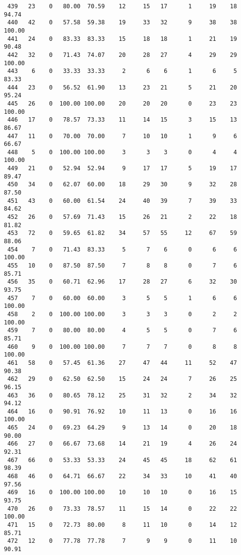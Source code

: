\begin{verbatim}
 439   23    0   80.00  70.59    12     15   17      1     19    18    94.74
 440   42    0   57.58  59.38    19     33   32      9     38    38   100.00
 441   24    0   83.33  83.33    15     18   18      1     21    19    90.48
 442   32    0   71.43  74.07    20     28   27      4     29    29   100.00
 443    6    0   33.33  33.33     2      6    6      1      6     5    83.33
 444   23    0   56.52  61.90    13     23   21      5     21    20    95.24
 445   26    0  100.00 100.00    20     20   20      0     23    23   100.00
 446   17    0   78.57  73.33    11     14   15      3     15    13    86.67
 447   11    0   70.00  70.00     7     10   10      1      9     6    66.67
 448    5    0  100.00 100.00     3      3    3      0      4     4   100.00
 449   21    0   52.94  52.94     9     17   17      5     19    17    89.47
 450   34    0   62.07  60.00    18     29   30      9     32    28    87.50
 451   43    0   60.00  61.54    24     40   39      7     39    33    84.62
 452   26    0   57.69  71.43    15     26   21      2     22    18    81.82
 453   72    0   59.65  61.82    34     57   55     12     67    59    88.06
 454    7    0   71.43  83.33     5      7    6      0      6     6   100.00
 455   10    0   87.50  87.50     7      8    8      0      7     6    85.71
 456   35    0   60.71  62.96    17     28   27      6     32    30    93.75
 457    7    0   60.00  60.00     3      5    5      1      6     6   100.00
 458    2    0  100.00 100.00     3      3    3      0      2     2   100.00
 459    7    0   80.00  80.00     4      5    5      0      7     6    85.71
 460    9    0  100.00 100.00     7      7    7      0      8     8   100.00
 461   58    0   57.45  61.36    27     47   44     11     52    47    90.38
 462   29    0   62.50  62.50    15     24   24      7     26    25    96.15
 463   36    0   80.65  78.12    25     31   32      2     34    32    94.12
 464   16    0   90.91  76.92    10     11   13      0     16    16   100.00
 465   24    0   69.23  64.29     9     13   14      0     20    18    90.00
 466   27    0   66.67  73.68    14     21   19      4     26    24    92.31
 467   66    0   53.33  53.33    24     45   45     18     62    61    98.39
 468   46    0   64.71  66.67    22     34   33     10     41    40    97.56
 469   16    0  100.00 100.00    10     10   10      0     16    15    93.75
 470   26    0   73.33  78.57    11     15   14      0     22    22   100.00
 471   15    0   72.73  80.00     8     11   10      0     14    12    85.71
 472   12    0   77.78  77.78     7      9    9      0     11    10    90.91

\end{verbatim}
